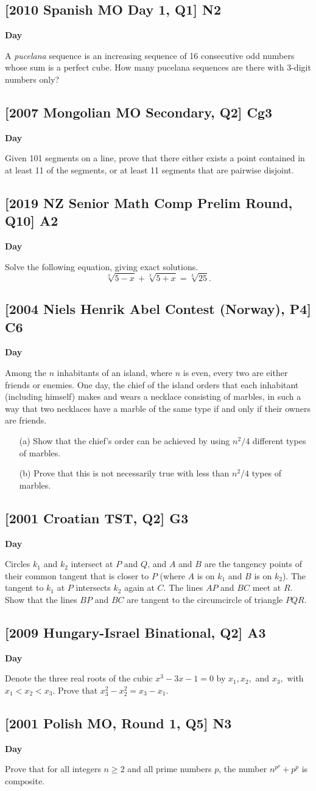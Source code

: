 \documentclass[10pt]{article}
\newcommand{\themonth}{March}
\newcommand{\theyear}{2019}
\newcounter{day}
\newcounter{solution}
\newcounter{datenumber}
\newcommand{\problem}[4][0]{
	\newpage
	\subsection{[#3] \space #2} \hfill 
	{\large\textbf{Day \arabic{day}}} %
	\begin{flushleft} #4 \end{flushleft}
	\vspace{1em}
	\addtocounter{day}{1}
	\addtocounter{datenumber}{1}
	\setcounter{solution}{1}
}
\begin{document}
\problem[93]{N2}{2010 Spanish MO Day 1, Q1}{A \textit{pucelana} sequence is an increasing sequence of 16 consecutive odd numbers whose sum is a perfect cube. How many pucelana sequences are there with 3-digit numbers only?}

\problem[94]{Cg3}{2007 Mongolian MO Secondary, Q2}{Given 101 segments on a line, prove that there either exists a point contained in at least 11 of the segments, or at least 11 segments that are pairwise disjoint.}

\problem{A2}{2019 NZ Senior Math Comp Prelim Round, Q10}{Solve the following equation, giving exact solutions. 
	\[\sqrt[3]{5-x} + \sqrt[3]{5+x}=\sqrt[3]{25}.\]}

\problem{C6}{2004 Niels Henrik Abel Contest (Norway), P4}{Among the \(n\) inhabitants of an island, where \(n\) is even, every two are either friends or enemies. One day, the chief of the island orders that each inhabitant (including himself) makes and wears a necklace consisting of marbles, in such a way that two necklaces have a marble of the same type if and only if their owners are friends.
	\begin{enumerate}
		\item[(a)] Show that the chief’s order can be achieved by using \(n^2/4\) different types of marbles.
		\item[(b)] Prove that this is not necessarily true with less than \(n^2/4\) types of marbles.
	\end{enumerate}}

\problem{G3}{2001 Croatian TST, Q2}{
Circles \(k_1\) and \(k_2\) intersect at \(P\) and \(Q\), and \(A\) and \(B\) are the tangency points of their common tangent that is closer to \(P\) (where \(A\) is on \(k_1\) and \(B\) is on \(k_2\)). The tangent to \(k_1\) at \(P\) intersects \(k_2\) again at \(C\). The lines \(AP\) and \(BC\) meet at \(R\). Show that the lines \(BP\) and \(BC\) are tangent to the circumcircle of triangle \(PQR\).}

\renewcommand{\themonth}{July}
\setcounter{datenumber}{1}

\problem[98]{A3}{2009 Hungary-Israel Binational, Q2}{Denote the three real roots of the cubic \(x^3 - 3x - 1 = 0\) by \(x_1, x_2,\) and \(x_3,\) with \(x_1 < x_2 < x_3\). Prove that \(x_3^2 - x_2^2 = x_3 - x_1.\)}

\problem[99]{N3}{2001 Polish MO, Round 1, Q5}{Prove that for all integers \(n \geq 2\) and all prime numbers \(p\), the number \(n^{p^p} + p^p\) is composite.}
\end{document}

